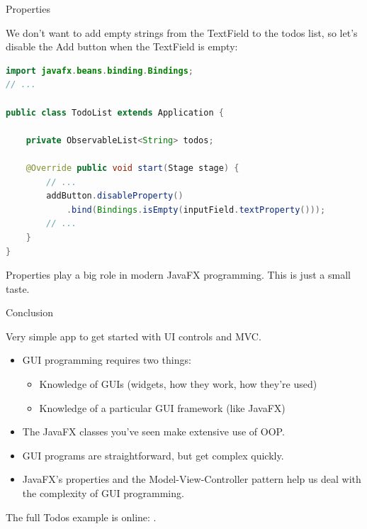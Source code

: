 \documentclass{beamer}
\begin{document}
\begin{frame}[fragile]{Properties}

We don't want to add empty strings from the TextField to the todos list, so let's disable the Add button when the TextField is empty:

\begin{lstlisting}[language=Java]
import javafx.beans.binding.Bindings;
// ...

public class TodoList extends Application {

    private ObservableList<String> todos;

    @Override public void start(Stage stage) {
        // ...
        addButton.disableProperty()
            .bind(Bindings.isEmpty(inputField.textProperty()));
        // ...
    }
}
\end{lstlisting}

Properties play a big role in modern JavaFX programming.  This is just a small taste.

\end{frame}


\begin{frame}[fragile]{Conclusion}

Very simple app to get started with UI controls and MVC.
\begin{itemize}
\item GUI programming requires two things:
\begin{itemize}
  \item Knowledge of GUIs (widgets, how they work, how they're used)
  \item Knowledge of a particular GUI framework (like JavaFX)
\end{itemize}
\item The JavaFX classes you've seen make extensive use of OOP.
\item GUI programs are straightforward, but get complex quickly.
\item JavaFX's properties and the Model-View-Controller pattern help us deal with the complexity of GUI programming.
\end{itemize}

The full Todos example is online: .

\end{frame}







\end{document}
